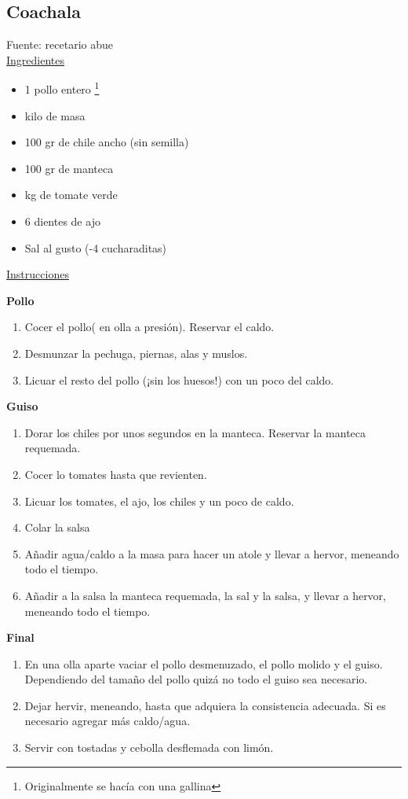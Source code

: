 \subsection{Coachala}

Fuente: recetario abue\\

\underline{Ingredientes}

\begin{itemize}
\item 1 pollo entero \footnote{Originalmente se hacía con una gallina}
\item {} kilo de masa
\item 100 gr de chile ancho (sin semilla)
\item 100 gr de manteca
\item {} kg de tomate verde
\item 6 dientes de ajo
\item Sal al gusto (-4 cucharaditas)
\end{itemize}

\underline{Instrucciones}

\textbf{Pollo}
\begin{enumerate}
\item Cocer el pollo( en olla a presión). Reservar el caldo.
\item Desmunzar la pechuga, piernas, alas y muslos.
\item Licuar el resto del pollo (¡sin los huesos!) con un poco del caldo.
\end{enumerate}

\textbf{Guiso}
\begin{enumerate}
\item Dorar los chiles por unos segundos en la manteca. Reservar la manteca requemada.
\item Cocer lo tomates hasta que revienten.
\item Licuar los tomates, el ajo, los chiles y un poco de caldo.
\item Colar la salsa
\item Añadir agua/caldo a la masa para hacer un atole y llevar a hervor, meneando todo el tiempo.
\item Añadir a la salsa la manteca requemada, la sal y la salsa, y llevar a hervor, meneando todo el tiempo.
\end{enumerate}

\textbf{Final}
\begin{enumerate}
\item En una olla aparte vaciar el pollo desmenuzado, el pollo molido y el guiso. Dependiendo del tamaño del pollo quizá no todo el guiso sea necesario.
\item Dejar hervir, meneando, hasta que adquiera la consistencia adecuada. Si es necesario agregar más caldo/agua.
\item Servir con tostadas y cebolla desflemada con limón.
\end{enumerate}